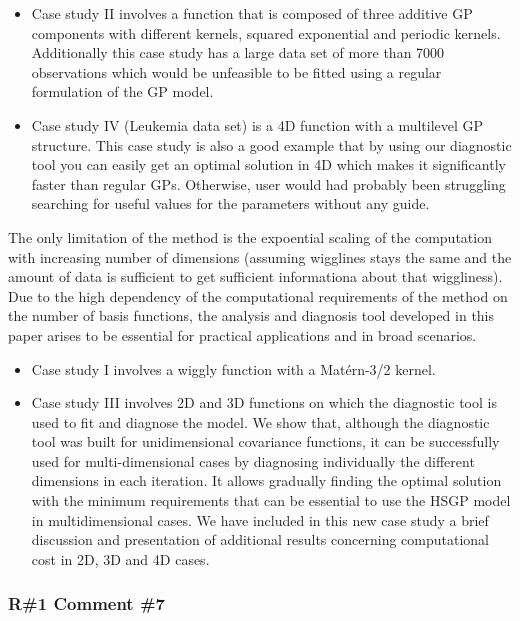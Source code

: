 \documentclass[11pt]{report}
\begin{document}
\begin{itemize}
\item Case study II involves a function that is composed of three additive GP components with different kernels, squared exponential and periodic kernels. Additionally this case study has a large data set of more than 7000 observations which would be unfeasible to be fitted using a regular formulation of the GP model.

\item Case study IV (Leukemia data set) is a 4D function with a multilevel GP structure. This case study is also a good example that by using our diagnostic tool you can easily get an optimal solution in 4D which makes it significantly faster than regular GPs. Otherwise, user would had probably been struggling searching for useful values for the parameters without any guide.
\end{itemize}

The only limitation of the method is the expoential scaling of the computation with increasing number of dimensions (assuming wigglines stays the same and the amount of data is sufficient to get sufficient informationa about that wiggliness). 
Due to the high dependency of the computational requirements of the method on the number of basis functions, the analysis and diagnosis tool developed in this paper arises to be essential for practical applications and in broad scenarios.

\begin{itemize}
\item Case study I involves a wiggly function with a Mat\'ern-3/2 kernel. 

\item Case study III involves 2D and 3D functions on which the diagnostic tool is used to fit and diagnose the model. We show that, although the diagnostic tool was built for unidimensional covariance functions, it can be successfully used for multi-dimensional cases by diagnosing individually the different dimensions in each iteration. It allows gradually finding the optimal solution with the minimum requirements that can be essential to use the HSGP model in multidimensional cases. We have included in this new case study a brief discussion and presentation of additional results concerning computational cost in 2D, 3D and 4D cases.
\end{itemize}

\subsubsection*{R\#1 Comment \#7}
\end{document}
